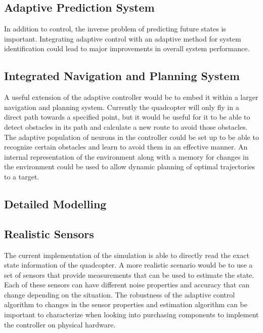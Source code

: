 \documentclass[letterpaper,12pt,titlepage,oneside,final]{book}
\begin{document}
\subsection{Adaptive Prediction System}

In addition to control, the inverse problem of predicting future states is important.
Integrating adaptive control with an adaptive method for system identification could lead to major improvements in overall system performance.

\subsection{Integrated Navigation and Planning System}

A useful extension of the adaptive controller would be to embed it within a larger navigation and planning system.
Currently the quadcopter will only fly in a direct path towards a specified point, but it would be useful for it to be able to detect obstacles in its path and calculate a new route to avoid those obstacles.
The adaptive population of neurons in the controller could be set up to be able to recognize certain obstacles and learn to avoid them in an effective manner.
An internal representation of the environment along with a memory for changes in the environment could be used to allow dynamic planning of optimal trajectories to a target.

\subsection{Detailed Modelling}



\subsection{Realistic Sensors}

The current implementation of the simulation is able to directly read the exact state information of the quadcopter.
A more realistic scenario would be to use a set of sensors that provide measurements that can be used to estimate the state.
Each of these sensors can have different noise properties and accuracy that can change depending on the situation.
The robustness of the adaptive control algorithm to changes in the sensor properties and estimation algorithm can be important to characterize when looking into purchasing components to implement the controller on physical hardware.
\end{document}
